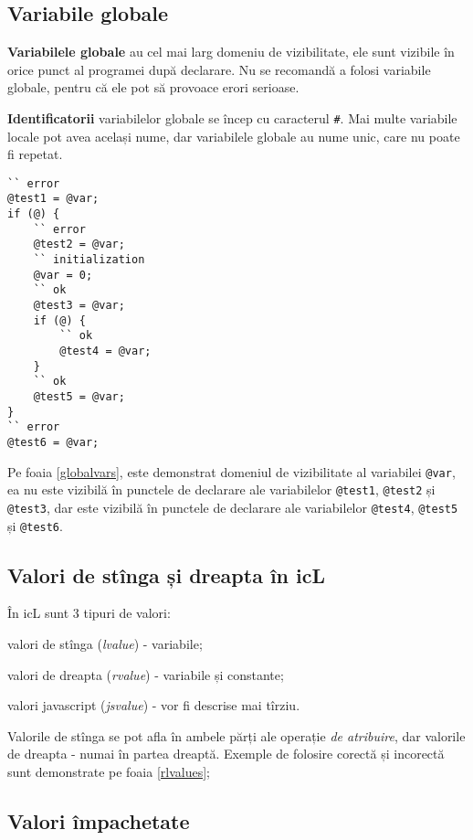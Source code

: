 \subsection{Variabile globale}

\textbf{Variabilele globale} au cel mai larg domeniu de vizibilitate, ele sunt vizibile în orice punct al programei după declarare. Nu se recomandă a folosi variabile globale, pentru că ele pot să provoace erori serioase.

{\bf Identificatorii} variabilelor globale se încep cu caracterul {\color{blue2}\lstinline|#|}. Mai multe variabile locale pot avea același nume, dar variabilele globale au nume unic, care nu poate fi repetat.

\begin{lstlisting}[caption=Domeniul de vizibilitate al variabilei locale, label=localvars]
`` error
@test1 = @var;
if (@) {
	`` error
	@test2 = @var;
	`` initialization
	@var = 0;
	`` ok
	@test3 = @var;
	if (@) {
		`` ok
		@test4 = @var;
	}
	`` ok
	@test5 = @var;
}
`` error
@test6 = @var;
\end{lstlisting}

Pe foaia \ref{globalvars}, este demonstrat domeniul de vizibilitate al variabilei \lstinline|@var|, ea nu este vizibilă în punctele de declarare ale variabilelor \lstinline|@test1|, \lstinline|@test2| și \lstinline|@test3|, dar este vizibilă în punctele de declarare ale variabilelor \lstinline|@test4|, \lstinline|@test5| și \lstinline|@test6|.

\subsection{Valori de stînga și dreapta în icL}

În icL sunt 3 tipuri de valori:

\begin{icEnum}
\item
	valori de stînga ({\it lvalue}) - variabile;
\item
	valori de dreapta ({\it rvalue}) - variabile și constante;
\item
	valori javascript ({\it jsvalue}) - vor fi descrise mai tîrziu.
\end{icEnum}

Valorile de stînga se pot afla în ambele părți ale operație {\it de atribuire}, dar valorile de dreapta - numai în partea dreaptă. Exemple de folosire corectă și incorectă sunt demonstrate pe foaia \ref{rlvalues};

\subsection{Valori împachetate}

